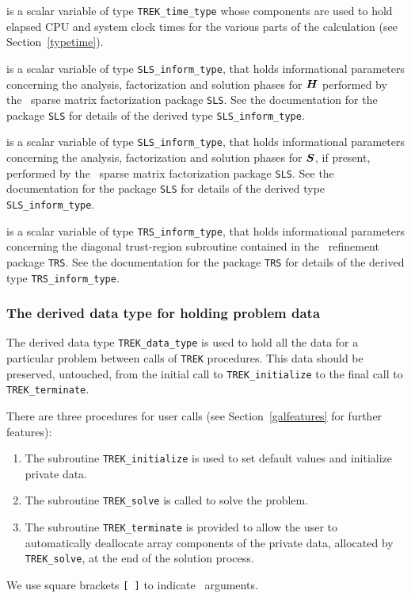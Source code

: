 \documentclass{galahad}
\newcommand{\packagename}{TREK}
\begin{document}
\begin{description}
 is a scalar variable of type {\tt \packagename\_time\_type}
whose components are used to hold elapsed CPU  and system clock times for the
various parts of the calculation (see Section~\ref{typetime}).

 is a scalar variable of type {\tt SLS\_inform\_type},
that holds informational parameters concerning the analysis, factorization
and solution phases for ${\bm{H}}$ performed by
the \galahad\ sparse matrix factorization package {\tt SLS}.
See the documentation for the package {\tt SLS} for details of the
derived type {\tt SLS\_inform\_type}.

 is a scalar variable of type {\tt SLS\_inform\_type},
that holds informational parameters concerning the analysis, factorization
and solution phases for ${\bm{S}}$, if present, performed by
the \galahad\ sparse matrix factorization package {\tt SLS}.
See the documentation for the package {\tt SLS} for details of the
derived type {\tt SLS\_inform\_type}.

 is a scalar variable of type {\tt TRS\_inform\_type},
that holds informational parameters concerning the 
diagonal trust-region subroutine
contained in the \galahad\ refinement package {\tt TRS}.
See the documentation for the package {\tt TRS} for details of the
derived type {\tt TRS\_inform\_type}.


\end{description}


\subsubsection{The derived data type for holding problem data}\label{typedata}
The derived data type
{\tt \packagename\_data\_type}
is used to hold all the data for a particular problem between calls of
{\tt \packagename} procedures.
This data should be preserved, untouched, from the initial call to
{\tt \packagename\_initialize}
to the final call to
{\tt \packagename\_terminate}.


\galarguments
There are three procedures for user calls
(see Section~\ref{galfeatures} for further features):

\begin{enumerate}
\item The subroutine
      {\tt \packagename\_initialize}
      is used to set default values and initialize private data.
\item The subroutine
      {\tt \packagename\_solve}
      is called to solve the problem.
\item The subroutine
      {\tt \packagename\_terminate}
      is provided to allow the user to automatically deallocate array
       components of the private data, allocated by
       {\tt \packagename\_solve},
       at the end of the solution process.
\end{enumerate}
We use square brackets {\tt [ ]} to indicate \optional\ arguments.
\end{document}
